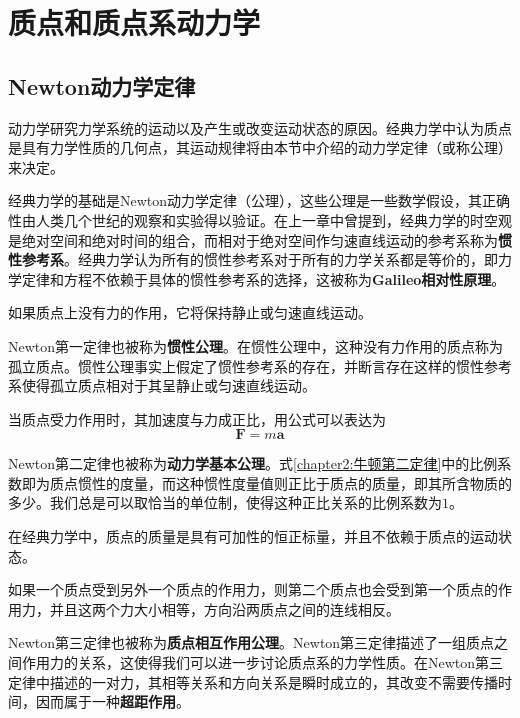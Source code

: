 \chapter{质点和质点系动力学}

\section{Newton动力学定律}

动力学研究力学系统的运动以及产生或改变运动状态的原因。经典力学中认为质点是具有力学性质的几何点，其运动规律将由本节中介绍的动力学定律（或称公理）来决定。

经典力学的基础是Newton动力学定律（公理），这些公理是一些数学假设，其正确性由人类几个世纪的观察和实验得以验证。在上一章中曾提到，经典力学的时空观是绝对空间和绝对时间的组合，而相对于绝对空间作匀速直线运动的参考系称为{\bf 惯性参考系}。经典力学认为所有的惯性参考系对于所有的力学关系都是等价的，即力学定律和方程不依赖于具体的惯性参考系的选择，这被称为{\bf Galileo相对性原理}。

\begin{law}[Newton第一定律]
	如果质点上没有力的作用，它将保持静止或匀速直线运动。
\end{law}

Newton第一定律也被称为{\bf 惯性公理}。在惯性公理中，这种没有力作用的质点称为孤立质点。惯性公理事实上假定了惯性参考系的存在，并断言存在这样的惯性参考系使得孤立质点相对于其呈静止或匀速直线运动。

\begin{law}[Newton第二定律]
	当质点受力作用时，其加速度与力成正比，用公式可以表达为
	\begin{equation}
		\boldsymbol{F} = m\boldsymbol{a}
		\label{chapter2:牛顿第二定律}
	\end{equation}
\end{law}

Newton第二定律也被称为{\bf 动力学基本公理}。式\eqref{chapter2:牛顿第二定律}中的比例系数即为质点惯性的度量，而这种惯性度量值则正比于质点的质量，即其所含物质的多少。我们总是可以取恰当的单位制，使得这种正比关系的比例系数为$1$。

在经典力学中，质点的质量是具有可加性的恒正标量，并且不依赖于质点的运动状态。

\begin{law}[Newton第三定律]
	如果一个质点受到另外一个质点的作用力，则第二个质点也会受到第一个质点的作用力，并且这两个力大小相等，方向沿两质点之间的连线相反。
\end{law}

Newton第三定律也被称为{\bf 质点相互作用公理}。Newton第三定律描述了一组质点之间作用力的关系，这使得我们可以进一步讨论质点系的力学性质。在Newton第三定律中描述的一对力，其相等关系和方向关系是瞬时成立的，其改变不需要传播时间，因而属于一种{\bf 超距作用}。

